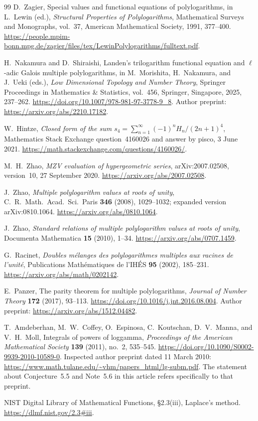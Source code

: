 \begin{thebibliography}{99}
D.~Zagier, Special values and functional equations of polylogarithms,
in L.~Lewin (ed.), \emph{Structural Properties of Polylogarithms},
Mathematical Surveys and Monographs, vol.~37,
American Mathematical Society, 1991, 377--400.
\url{https://people.mpim-bonn.mpg.de/zagier/files/tex/LewinPolylogarithms/fulltext.pdf}.

H.~Nakamura and D.~Shiraishi, Landen's trilogarithm functional
equation and $\ell$-adic Galois multiple polylogarithms,
in M.~Morishita, H.~Nakamura, and J.~Ueki (eds.),
\emph{Low Dimensional Topology and Number Theory},
Springer Proceedings in Mathematics \& Statistics, vol.~456,
Springer, Singapore, 2025, 237--262.
\url{https://doi.org/10.1007/978-981-97-3778-9_8}.
Author preprint: \url{https://arxiv.org/abs/2210.17182}.

W.~Hintze, \emph{Closed form of the sum
$s_4=\sum_{n=1}^{\infty}(-1)^nH_n/(2n+1)^4$},
Mathematics Stack Exchange question~4160026 and answer by pisco,
3 June 2021.
\url{https://math.stackexchange.com/questions/4160026/}.

M.~H.~Zhao, \emph{MZV evaluation of hypergeometric series},
arXiv:2007.02508, version~10, 27 September 2020.
\url{https://arxiv.org/abs/2007.02508}.

J.~Zhao, \emph{Multiple polylogarithm values at roots of unity},
C.~R.~Math.~Acad.~Sci.~Paris \textbf{346} (2008), 1029--1032;
expanded version arXiv:0810.1064.
\url{https://arxiv.org/abs/0810.1064}.

J.~Zhao, \emph{Standard relations of multiple polylogarithm values at roots
of unity}, Documenta Mathematica \textbf{15} (2010), 1--34.
\url{https://arxiv.org/abs/0707.1459}.

G.~Racinet, \emph{Doubles m\'elanges des polylogarithmes multiples aux
racines de l'unit\'e}, Publications Math\'ematiques de l'IH\'ES
\textbf{95} (2002), 185--231.
\url{https://arxiv.org/abs/math/0202142}.

E.~Panzer, The parity theorem for multiple polylogarithms,
\emph{Journal of Number Theory} \textbf{172} (2017), 93--113.
\url{https://doi.org/10.1016/j.jnt.2016.08.004}.
Author preprint: \url{https://arxiv.org/abs/1512.04482}.

T.~Amdeberhan, M.~W.~Coffey, O.~Espinosa, C.~Koutschan,
D.~V.~Manna, and V.~H.~Moll,
Integrals of powers of loggamma,
\emph{Proceedings of the American Mathematical Society}
\textbf{139} (2011), no.~2, 535--545.
\url{https://doi.org/10.1090/S0002-9939-2010-10589-0}.
Inspected author preprint dated 11 March 2010:
\url{https://www.math.tulane.edu/~vhm/papers_html/lg-subm.pdf}.
The statement about Conjecture~5.5 and Note~5.6 in this article refers
specifically to that preprint.

NIST Digital Library of Mathematical Functions,
\S2.3(iii), Laplace's method.
\url{https://dlmf.nist.gov/2.3#iii}.
\end{thebibliography}
